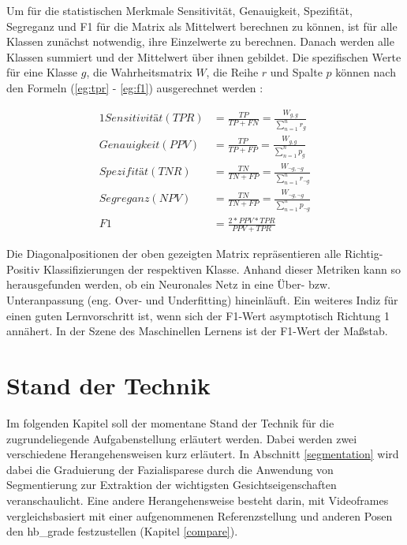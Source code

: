Um für die statistischen Merkmale Sensitivität, Genauigkeit, Spezifität, Segreganz und F1 für die Matrix als Mittelwert berechnen zu können, ist für alle Klassen zunächst notwendig, ihre Einzelwerte zu berechnen. Danach werden alle Klassen summiert und der Mittelwert über ihnen gebildet. Die spezifischen Werte für eine Klasse $g$, die Wahrheitsmatrix $W$, die Reihe $r$ und Spalte $p$ können nach den Formeln (\ref{eg:tpr} - \ref{eg:f1}) ausgerechnet werden \cite{matrix_calc_paper}:


\begin{alignat}{1}
  Sensitivität (TPR) &= \frac{TP}{TP + FN} = \frac{W_{g, g}}{\sum_{n=1}^{n} r_{g}}                \label{eg:tpr}\\
  Genauigkeit (PPV)  &= \frac{TP}{TP + FP} = \frac{W_{g, g}}{\sum_{n=1}^{n} p_{g}}                \label{eg:ppv}\\
  Spezifität (TNR)   &= \frac{TN}{TN + FP} = \frac{W_{\neg g, \neg g}}{\sum_{n=1}^{n} r_{\neg g}} \label{eg:tnr}\\
  Segreganz (NPV)    &= \frac{TN}{TN + FP} = \frac{W_{\neg g, \neg g}}{\sum_{n=1}^{n} p_{\neg g}} \label{eg:npr}\\
  F1                 &= \frac{2 * PPV * TPR}{PPV + TPR}                                           \label{eg:f1}
\end{alignat}


Die Diagonalpositionen der oben gezeigten Matrix repräsentieren alle Richtig-Positiv Klassifizierungen der respektiven Klasse. Anhand dieser Metriken kann so herausgefunden werden, ob ein Neuronales Netz in eine Über- bzw. Unteranpassung (eng. Over- und Underfitting) hineinläuft. Ein weiteres Indiz für einen guten Lernvorschritt ist, wenn sich der F1-Wert asymptotisch Richtung 1 annähert. In der Szene des Maschinellen Lernens ist der F1-Wert der Maßstab.


























\chapter{Stand der Technik}\label{std}
Im folgenden Kapitel soll der momentane Stand der Technik für die zugrundeliegende Aufgabenstellung erläutert werden. Dabei werden zwei verschiedene Herangehensweisen kurz erläutert. In Abschnitt \ref{segmentation} wird dabei die Graduierung der Fazialisparese durch die Anwendung von Segmentierung zur Extraktion der wichtigsten Gesichtseigenschaften veranschaulicht. Eine andere Herangehensweise besteht darin, mit Videoframes vergleichsbasiert mit einer aufgenommenen Referenzstellung und anderen Posen den \ac{hb_grade} festzustellen (Kapitel \ref{compare}).

